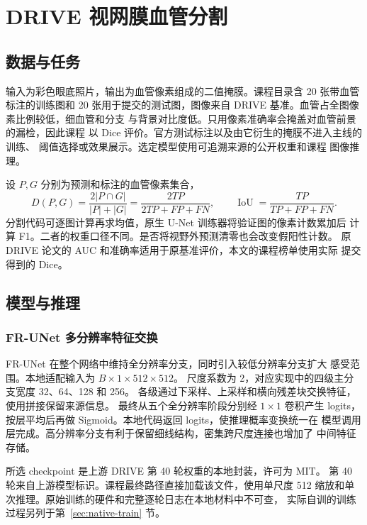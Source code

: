 \chapter{DRIVE 视网膜血管分割}
\label{chap:drive}

\section{数据与任务}
输入为彩色眼底照片，输出为血管像素组成的二值掩膜。课程目录含
20 张带血管标注的训练图和 20 张用于提交的测试图，图像来自 DRIVE
基准\citep{staal2004drive}。血管占全图像素比例较低，细血管和分支
与背景对比度低。只用像素准确率会掩盖对血管前景的漏检，因此课程
以 Dice 评价。官方测试标注以及由它衍生的掩膜不进入主线的训练、
阈值选择或效果展示。选定模型使用可追溯来源的公开权重和课程
图像推理。

设 $P,G$ 分别为预测和标注的血管像素集合，
\begin{equation}
  D(P,G)=\frac{2|P\cap G|}{|P|+|G|}
  =\frac{2TP}{2TP+FP+FN},\qquad
  \operatorname{IoU}=\frac{TP}{TP+FP+FN}.
  \label{eq:drive-dice}
\end{equation}
分割代码可逐图计算再求均值，原生 U-Net 训练器将验证图的像素计数累加后
计算 F1。二者的权重口径不同。是否将视野外预测清零也会改变假阳性计数。
原 DRIVE 论文的 AUC 和准确率适用于原基准评价，本文的课程榜单使用实际
提交得到的 Dice。

\section{模型与推理}
\subsection{FR-UNet 多分辨率特征交换}
FR-UNet 在整个网络中维持全分辨率分支，同时引入较低分辨率分支扩大
感受范围\citep{liu2022frunet}。本地适配输入为 $B\times1\times512\times512$。
尺度系数为 2，对应实现中的四级主分支宽度 32、64、128 和 256。
各级通过下采样、上采样和横向残差块交换特征，使用拼接保留来源信息。
最终从五个全分辨率阶段分别经 $1\times1$ 卷积产生 logits，
按层平均后再做 Sigmoid。本地代码返回 logits，使推理概率变换统一在
模型调用层完成。高分辨率分支有利于保留细线结构，密集跨尺度连接也增加了
中间特征存储。


所选 checkpoint 是上游 DRIVE 第 40 轮权重的本地封装，许可为 MIT。
第 40 轮来自上游模型标识。课程最终路径直接加载该文件，使用单尺度
512 缩放和单次推理。原始训练的硬件和完整逐轮日志在本地材料中不可查，
实际自训的训练过程另列于第~\ref{sec:native-train} 节。

